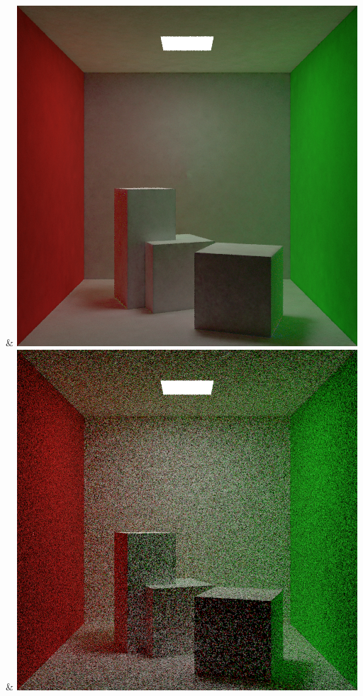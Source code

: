 & \includegraphics[width=\linewidth]{figures/py/tests/quality_comparison/nrc+sppc_1spp_diffuse.png}
& \includegraphics[width=\linewidth]{figures/py/tests/quality_comparison/sppm_1spp_diffuse.png}
